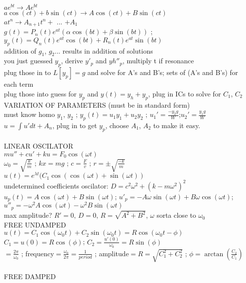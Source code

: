 \documentclass{article}
\begin{document}
\begin{large}
\\$ae^{bt} \rightarrow Ae^{bt}$
\\$a\cos(ct)+b\sin(ct) \rightarrow A\cos(ct)+B\sin(ct)$
\\$at^n \rightarrow A_{n+1}t^n+$ ... $+A_1$
\\$g(t)=P_n(t)e^{at}(\alpha\cos(bt)+\beta\sin(bt))$ ; $y_p(t)=Q_n(t)e^{at}\cos(bt)+R_n(t)e^{at}\sin(bt)$
\\addition of $g_1$, $g_2$... results in addition of solutions
\\you just guessed $y_p$, derive $y'_p$ and $yh''_p$, multiply t if resonance
\\plug those in to $L[y_p]=g$ and solve for A's and B's; sets of (A's and B's) for each term
\\plug those into guess for $y_p$ and $y(t)=y_h+y_p$, plug in ICs to solve for $C_1$, $C_2$
\\VARIATION OF PARAMETERS (must be in standard form)
\\must know homo $y_1$, $y_2$ ;  $y_p(t)=u_1y_1+u_2y_2$ ;  $u_1'=\frac{-y_2g}{W}$;$u_2'=\frac{y_1g}{W}$
\\$u=\int u' dt + A_n$, plug in to get $y_p$, choose $A_1$, $A_2$ to make it easy.
\\
\\LINEAR OSCILATOR
\\$mu''+cu'+ku=F_0\cos(\omega t)$
\\$\omega_0=\sqrt{\frac{k}{m}}$ ;  $kx=mg$ ;  $c=\frac{F}{v}$ ;  $r=\pm\sqrt{\frac{-k}{m}}$
\\$u(t)=e^{\lambda t}(C_1\cos(\cos(\omega t)+\sin(\omega t))$
\\undetermined coefficients oscilator: $D=c^2\omega^2+(k-m\omega^2)^2$
\\$u_p(t)=A\cos(\omega t)+B\sin(\omega t)$; $u'_p=-A\omega\sin(\omega t)+B\omega\cos(\omega t)$; $u''_p=-\omega^2A\cos(\omega t)-\omega^2B\sin(\omega t)$
\\max amplitude? $R'=0$, $D=0$, $R=\sqrt{A^2+B^2}$, $\omega$ sorta close to $\omega_0$
\\FREE UNDAMPED
\\$u(t)=C_1\cos(\omega_0 t)+C_2\sin(\omega_0 t)=R\cos(\omega_0 t-\phi)$
\\$C_1=u(0)=R\cos(\phi)$; $C_2=\frac{u'(0)}{\omega_0}=R\sin(\phi)$
\\$=\frac{2\pi}{\omega_0}$ ;  frequency$=\frac{\omega_0}{2\pi}=\frac{1}{period}$ ;  amplitude$=R=\sqrt{C_1^2+C_2^2}$ ;  $\phi=\arctan(\frac{C_2}{C_1})$
\\
\\FREE DAMPED

\end{large}
\end{document}
